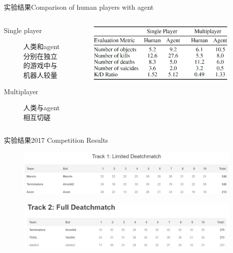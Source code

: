 \documentclass[10pt]{beamer}
\begin{document}
	\begin{frame}{实验结果}{Comparison of human players with agent}
		\begin{columns}
			\begin{column}{.5\linewidth}
				\begin{description}
					\item[Single player] 人类和agent分别在独立的游戏中与机器人较量
					
					\item[Multiplayer] 人类与agent相互切磋
					
				\end{description}
			\end{column}
			\begin{column}{.5\linewidth}
				\begin{figure}
					\centering
					\includegraphics[width=0.9\linewidth]{pictures/fps-exper-result-4}
				\end{figure}
			\end{column}
		\end{columns}
	\end{frame}

	\begin{frame}{实验结果}{2017 Competition Results}
		\begin{figure}
			\centering
			\includegraphics[width=0.9\linewidth]{pictures/fps-exper-result-5}
		\end{figure}
		
		\begin{figure}
			\centering
			\includegraphics[width=0.9\linewidth]{pictures/fps-exper-result-6}
		\end{figure}
	\end{frame}
\end{document}
